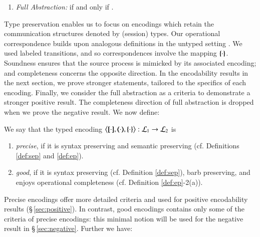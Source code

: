 \begin{definition}
\begin{enumerate}[1.]
		\item \emph{Full Abstraction:} 
		if and only if
		.
	\end{enumerate}
\end{definition}

\smallskip 

\noi Type preservation enables us to focus on encodings which retain the communication structures denoted by (session) types.
Our operational correspondence builds upon analogous definitions in the untyped setting \cite{}. 
We used labeled transitions, and so correspondences involve the mapping $\{\!\!\{\cdot\}\!\!\}$.
Soundness ensures that the source process is mimicked 
by its associated encoding; and completeness concerns the opposite direction.
In the encodability results in the next section, 
we prove stronger statements, tailored to the specifics of each encoding.
Finally, we consider the full abstraction as a criteria to demonstrate 
a stronger positive result. The completeness direction 
of full abstraction is dropped when we prove the negative result.  
We now define:

\smallskip 



\begin{definition}\label{def:goodenc}
We say that the typed encoding 
	$\enco{\map{\cdot}, \mapt{\cdot}, \mapa{\cdot}}: \tyl{L}_1 \to \tyl{L}_2$ is 
\begin{enumerate}
\item \emph{precise}, if it is syntax preserving and semantic preserving (cf. Definitions \ref{def:sep} and  \ref{def:ep}).
\item \emph{good}, if it is syntax preserving 
(cf. Definition \ref{def:sep}),
barb preserving, and enjoys operational completeness (cf. Definition \ref{def:ep}-2(a)).
\end{enumerate}
\end{definition}
Precise encodings offer more detailed criteria and used for positive 
encodability results (\S\,\ref{sec:positive}).
In contrast, good encodings contains only 
some of the criteria of precise encodings:    
this minimal notion will be used 
for the negative result in \S\,\ref{sec:negative}. Further we have:

